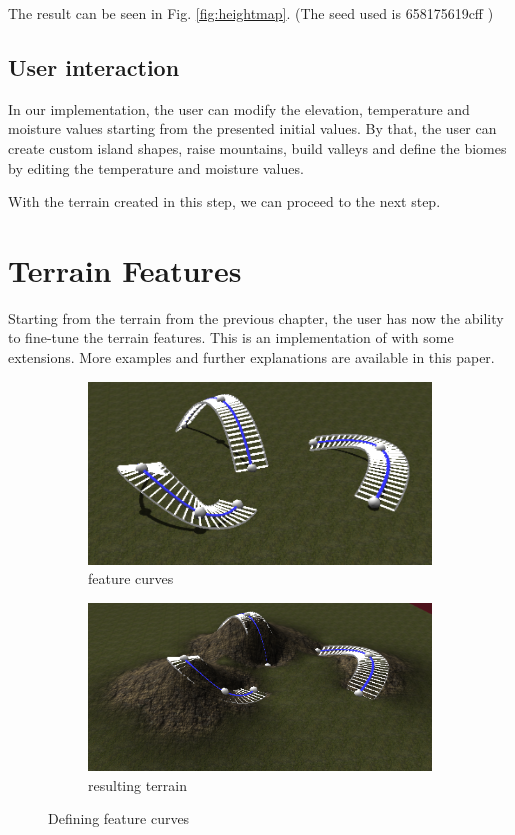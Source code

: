\documentclass[journal, letterpaper]{IEEEtran}
\begin{document}
The result can be seen in Fig. \ref{fig:heightmap}. (The seed used is 658175619cff )

\subsection{User interaction}
In our implementation, the user can modify the elevation, temperature and moisture values starting from the presented initial values.
By that, the user can create custom island shapes, raise mountains, build valleys and define the biomes by editing the temperature and moisture values.

With the terrain created in this step, we can proceed to the next step.

\section{Terrain Features}\label{TerrainFeatures}
Starting from the terrain from the previous chapter, the user has now the ability to fine-tune the terrain features.
This is an implementation of \cite{Hnaidi.2010} with some extensions. More examples and further explanations are available in this paper.

\begin{figure}
	\centering
	\begin{subfigure}[b]{0.45\textwidth}
		\includegraphics[width=\textwidth]{images/diffusion1}
		\caption{feature curves}
		\label{fig:featurecurves}
	\end{subfigure}
	\begin{subfigure}[b]{0.45\textwidth}
		\includegraphics[width=\textwidth]{images/diffusion2}
		\caption{resulting terrain}
		\label{fig:resultingterrain}
	\end{subfigure}
	\caption{Defining feature curves}\label{fig:diffusion1}
\end{figure}
\end{document}
